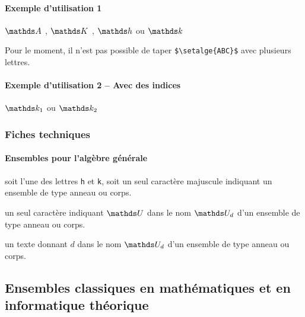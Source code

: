 \documentclass[12pt,a4paper]{article}
\begin{document}
\paragraph{Exemple d'utilisation 1}

\begin{latexex}
$\setalge{A}$ ,
$\setalge{K}$ ,
$\setalge{h}$ ou
$\setalge{k}$
\end{latexex}

\begin{remark}
	Pour le moment, il n'est pas possible de taper \verb+$\setalge{ABC}$+ avec plusieurs lettres.
\end{remark}




\paragraph{Exemple d'utilisation 2 -- Avec des indices}

\begin{latexex}
$\setalge*{k}{1}$ ou $\setalge*{k}{2}$
\end{latexex}




\subsubsection{Fiches techniques}

\paragraph{Ensembles pour l'algèbre générale}


\IDarg{} soit l'une des lettres  \texttt{h} et \texttt{k}, soit un seul caractère \ascii{} majuscule indiquant un ensemble de type anneau ou corps.


\separation



 un seul caractère \ascii{} indiquant $\setalge{U}$ dans le nom $\setalge*{U}{d}$ d'un ensemble de type anneau ou corps.

 un texte donnant $d$ dans le nom $\setalge*{U}{d}$ d'un ensemble de type anneau ou corps.




\subsection{Ensembles classiques en mathématiques et en informatique théorique} 
\end{document}
